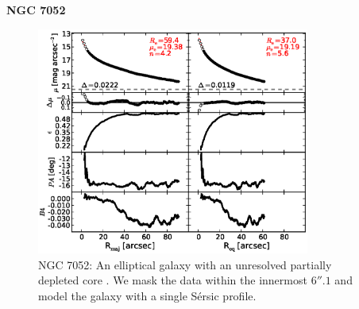 \documentclass[preprint2]{emulateapj}
\newcommand{\fitfigurewidth}{0.8\textwidth}
\begin{document}
  \clearpage\newpage\noindent
  {\bf NGC 7052 \\}

  \begin{figure}[h]
  \begin{center}
  \includegraphics[width=\fitfigurewidth]{images/n7052_1Dfit.eps}
  \caption{NGC 7052: 
  An elliptical galaxy with an unresolved partially depleted core \citep{quillen2000}. %
  We mask the data within the innermost $6''.1$ and model the galaxy with a single S\'ersic profile.
  }
  \end{center}
  \end{figure}
\end{document}
